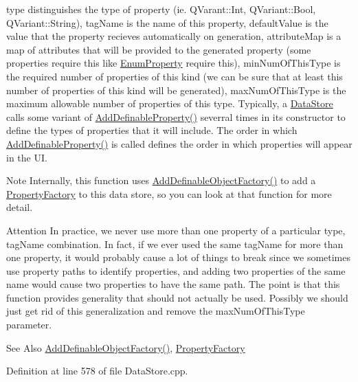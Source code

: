 type distinguishes the type of property (ie. Q\-Varant\-::\-Int, Q\-Variant\-::\-Bool, Q\-Variant\-::\-String), tag\-Name is the name of this property, default\-Value is the value that the property recieves automatically on generation, attribute\-Map is a map of attributes that will be provided to the generated property (some properties require this like \hyperlink{class_picto_1_1_enum_property}{Enum\-Property} require this), min\-Num\-Of\-This\-Type is the required number of properties of this kind (we can be sure that at least this number of properties of this kind will be generated), max\-Num\-Of\-This\-Type is the maximum allowable number of properties of this type. Typically, a \hyperlink{class_picto_1_1_data_store}{Data\-Store} calls some variant of \hyperlink{class_picto_1_1_data_store_aa26b8b2191fa50b0f963b1d94a6e3407}{Add\-Definable\-Property()} severral times in its constructor to define the types of properties that it will include. The order in which \hyperlink{class_picto_1_1_data_store_aa26b8b2191fa50b0f963b1d94a6e3407}{Add\-Definable\-Property()} is called defines the order in which properties will appear in the U\-I. \begin{DoxyNote}{Note}
Internally, this function uses \hyperlink{class_picto_1_1_data_store_a8a1c8ece2f1cbc05471ecff11e050ddb}{Add\-Definable\-Object\-Factory()} to add a \hyperlink{class_picto_1_1_property_factory}{Property\-Factory} to this data store, so you can look at that function for more detail. 
\end{DoxyNote}
\begin{DoxyAttention}{Attention}
In practice, we never use more than one property of a particular type, tag\-Name combination. In fact, if we ever used the same tag\-Name for more than one property, it would probably cause a lot of things to break since we sometimes use property paths to identify properties, and adding two properties of the same name would cause two properties to have the same path. The point is that this function provides generality that should not actually be used. Possibly we should just get rid of this generalization and remove the max\-Num\-Of\-This\-Type parameter. 
\end{DoxyAttention}
\begin{DoxySeeAlso}{See Also}
\hyperlink{class_picto_1_1_data_store_a8a1c8ece2f1cbc05471ecff11e050ddb}{Add\-Definable\-Object\-Factory()}, \hyperlink{class_picto_1_1_property_factory}{Property\-Factory} 
\end{DoxySeeAlso}


Definition at line 578 of file Data\-Store.\-cpp.

